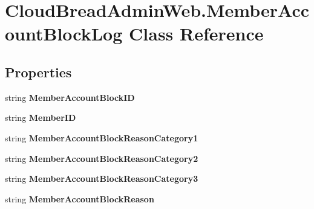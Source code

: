 \hypertarget{a00135}{}\section{Cloud\+Bread\+Admin\+Web.\+Member\+Account\+Block\+Log Class Reference}
\label{a00135}
\subsection*{Properties}
\begin{DoxyCompactItemize}
\item 
string {\bfseries Member\+Account\+Block\+ID}\hypertarget{a00135_a6a6192582fcf51cd441d528a85a34270}{}\label{a00135_a6a6192582fcf51cd441d528a85a34270}

\item 
string {\bfseries Member\+ID}\hypertarget{a00135_a6d0d97c60b43a51c9544972ba121dd6f}{}\label{a00135_a6d0d97c60b43a51c9544972ba121dd6f}

\item 
string {\bfseries Member\+Account\+Block\+Reason\+Category1}\hypertarget{a00135_ab8f3148b73762d3d6ab4c453221b999d}{}\label{a00135_ab8f3148b73762d3d6ab4c453221b999d}

\item 
string {\bfseries Member\+Account\+Block\+Reason\+Category2}\hypertarget{a00135_a640f57686213a599914dd82870b80973}{}\label{a00135_a640f57686213a599914dd82870b80973}

\item 
string {\bfseries Member\+Account\+Block\+Reason\+Category3}\hypertarget{a00135_a54838f5c1dbeda4dfe5d111cefe7f5eb}{}\label{a00135_a54838f5c1dbeda4dfe5d111cefe7f5eb}

\item 
string {\bfseries Member\+Account\+Block\+Reason}\hypertarget{a00135_af0b4d99150b1938b3331298280007eea}{}\label{a00135_af0b4d99150b1938b3331298280007eea}


\end{DoxyCompactItemize}
